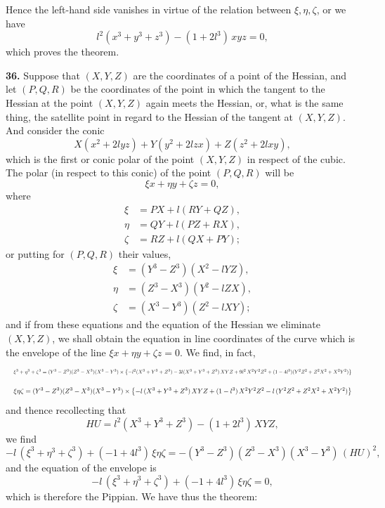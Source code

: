\documentclass[11pt]{article}
\begin{document}
Hence the left-hand side vanishes in virtue of the relation between $\xi, \eta, \zeta$, or we have
\[
l^2 (x^3 + y^3 + z^3) - (1 + 2 l^3)\, xyz = 0,
\]
which proves the theorem.

\bigskip

\noindent \textbf{36.} Suppose that $(X, Y, Z)$ are the coordinates of a point of the Hessian, and let $(P, Q, R)$ be the coordinates of the point in which the tangent to the Hessian at the point $(X, Y, Z)$ again meets the Hessian, or, what is the same thing, the satellite point in regard to the Hessian of the tangent at $(X, Y, Z)$. And consider the conic
\[
X(x^2 + 2 l yz) + Y(y^2 + 2 l zx) + Z(z^2 + 2 l xy),
\]
which is the first or conic polar of the point $(X, Y, Z)$ in respect of the cubic. The polar (in respect to this conic) of the point $(P, Q, R)$ will be
\[
\xi x + \eta y + \zeta z = 0,
\]
where
\begin{align*}
\xi &= P X + l(R Y + Q Z), \\
\eta &= Q Y + l(P Z + R X), \\
\zeta &= R Z + l(Q X + P Y);
\end{align*}
or putting for $(P, Q, R)$ their values,
\begin{align*}
\xi &= (Y^3 - Z^3)(X^2 - l Y Z), \\
\eta &= (Z^3 - X^3)(Y^2 - l Z X), \\
\zeta &= (X^3 - Y^3)(Z^2 - l X Y);
\end{align*}
and if from these equations and the equation of the Hessian we eliminate $(X, Y, Z)$, we shall obtain the equation in line coordinates of the curve which is the envelope of the line $\xi x + \eta y + \zeta z = 0$. We find, in fact,
\[
\resizebox{\textwidth}{!}{$\displaystyle \xi^3 + \eta^3 + \zeta^3 = (Y^3 - Z^3)(Z^3 - X^3)(X^3 - Y^3) \times \bigl\{-l^2 (X^3 + Y^3 + Z^3) - 3 l (X^3 + Y^3 + Z^3)\, X Y Z + 9 l^2\, X^2 Y^2 Z^2 + (1 - 4 l^3)(Y^2 Z^2 + Z^2 X^2 + X^2 Y^2)\bigr\}$}
\]
\[
\resizebox{\textwidth}{!}{$\displaystyle \xi \eta \zeta = (Y^3 - Z^3)(Z^3 - X^3)(X^3 - Y^3) \times \bigl\{- l\,(X^3 + Y^3 + Z^3)\, X Y Z + (1 - l^3)\, X^2 Y^2 Z^2 - l\,(Y^2 Z^2 + Z^2 X^2 + X^2 Y^2)\bigr\}$}
\]
and thence recollecting that
\[
H U = l^2 (X^3 + Y^3 + Z^3) - (1 + 2 l^3)\, X Y Z,
\]
we find
\[
- l\,(\xi^3 + \eta^3 + \zeta^3) + (-1 + 4 l^3)\,\xi \eta \zeta = -(Y^3 - Z^3)(Z^3 - X^3)(X^3 - Y^3)\,(H U)^2,
\]
and the equation of the envelope is
\[
- l\,(\xi^3 + \eta^3 + \zeta^3) + (-1 + 4 l^3)\,\xi \eta \zeta = 0,
\]
which is therefore the Pippian. We have thus the theorem:
\end{document}
